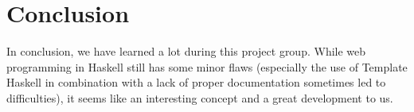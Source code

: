 \documentclass[a4paper]{easychair}
\begin{document}
\section{Conclusion}

In conclusion, we have learned a lot during this project group. While web programming in Haskell still has some minor flaws (especially the use of Template Haskell in combination with a lack of proper documentation sometimes led to difficulties), it seems like an interesting concept and a great development to us. 


%
\label{sect:bib}

%
%
%
%


\end{document}
